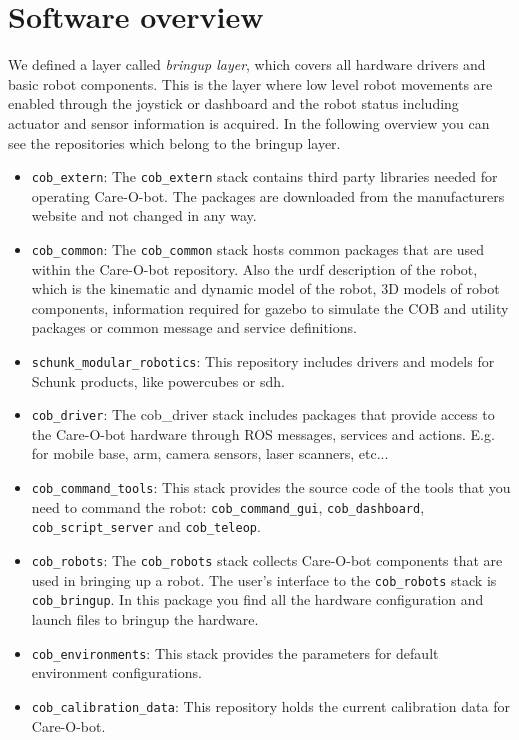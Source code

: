 \section{Software overview}\label{sec:software_overview}
We defined a layer called \textit{bringup layer}, which covers all hardware drivers and basic robot components. This is the layer where low level robot movements are enabled through the joystick or dashboard and the robot status including actuator and sensor information is acquired. In the following overview you can see the repositories which belong to the bringup layer.
\begin{itemize}
\item \texttt{cob\_extern}: The \texttt{cob\_extern} stack contains third party libraries needed for operating Care-O-bot. The packages are downloaded from the manufacturers website and not changed in any way.
\item \texttt{cob\_common}: The \texttt{cob\_common} stack hosts common packages that are used within the Care-O-bot repository. Also the urdf description of the robot, which is the kinematic and dynamic model of the robot, 3D models of robot components, information required for gazebo to simulate the COB and utility packages or common message and service definitions.
\item \texttt{schunk\_modular\_robotics}: This repository includes drivers and models for Schunk products, like powercubes or sdh.
\item \texttt{cob\_driver}: The cob\_driver stack includes packages that provide access to the Care-O-bot hardware through ROS messages, services and actions. E.g. for mobile base, arm, camera sensors, laser scanners, etc...
\item \texttt{cob\_command\_tools}: This stack provides the source code of the tools that you need to command the robot: \texttt{cob\_command\_gui}, \texttt{cob\_dashboard}, \texttt{cob\_script\_server} and \texttt{cob\_teleop}.
\item \texttt{cob\_robots}:  The \texttt{cob\_robots} stack collects Care-O-bot components that are used in bringing up a robot. The user's interface to the \texttt{cob\_robots} stack is \texttt{cob\_bringup}. In this package you find all the hardware configuration and launch files to bringup the hardware.
\item \texttt{cob\_environments}: This stack provides the parameters for default environment configurations.
\item \texttt{cob\_calibration\_data}: This repository holds the current calibration data for Care-O-bot.
\end{itemize}


